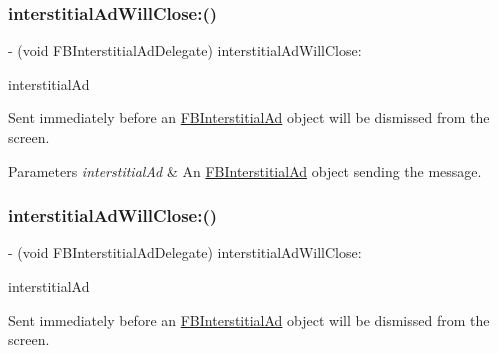 \subsubsection{\texorpdfstring{interstitial\+Ad\+Will\+Close\+:()}{interstitialAdWillClose:()}\hspace{0.1cm}{\footnotesize\ttfamily [1/5]}}
{\footnotesize\ttfamily -\/ (void F\+B\+Interstitial\+Ad\+Delegate) interstitial\+Ad\+Will\+Close\+: \begin{DoxyParamCaption}\item[{(\hyperlink{interfaceFBInterstitialAd}{F\+B\+Interstitial\+Ad} $\ast$)}]{interstitial\+Ad }\end{DoxyParamCaption}\hspace{0.3cm}{\ttfamily [optional]}}

Sent immediately before an \hyperlink{interfaceFBInterstitialAd}{F\+B\+Interstitial\+Ad} object will be dismissed from the screen.


\begin{DoxyParams}{Parameters}
{\em interstitial\+Ad} & An \hyperlink{interfaceFBInterstitialAd}{F\+B\+Interstitial\+Ad} object sending the message. \\
\hline
\end{DoxyParams}
\mbox{\label{protocolFBInterstitialAdDelegate_01-p_a9552e934440e2bbb01f09b7eb2e3a5a3}} 
\subsubsection{\texorpdfstring{interstitial\+Ad\+Will\+Close\+:()}{interstitialAdWillClose:()}\hspace{0.1cm}{\footnotesize\ttfamily [2/5]}}
{\footnotesize\ttfamily -\/ (void F\+B\+Interstitial\+Ad\+Delegate) interstitial\+Ad\+Will\+Close\+: \begin{DoxyParamCaption}\item[{(\hyperlink{interfaceFBInterstitialAd}{F\+B\+Interstitial\+Ad} $\ast$)}]{interstitial\+Ad }\end{DoxyParamCaption}\hspace{0.3cm}{\ttfamily [optional]}}

Sent immediately before an \hyperlink{interfaceFBInterstitialAd}{F\+B\+Interstitial\+Ad} object will be dismissed from the screen.


